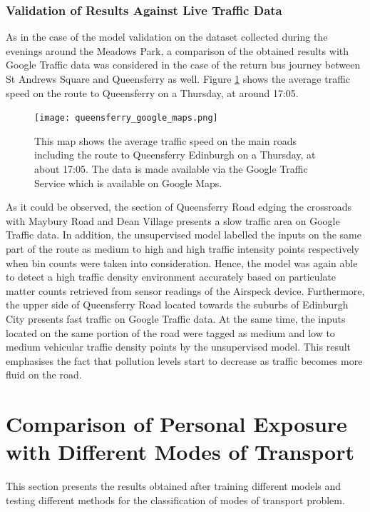 \documentclass[bsc,frontabs,twoside,singlespacing, parskip,deptreport]{infthesis}     %
\begin{document}
\subsubsection*{Validation of Results Against Live Traffic Data}

As in the case of the model validation on the dataset collected during the evenings around the Meadows Park, a comparison of the obtained results with Google Traffic data was considered in the case of the return bus journey between St Andrews Square and Queensferry as well. Figure \ref{fig:queensferry-google-maps} shows the average traffic speed on the route to Queensferry on a Thursday, at around 17:05.

\begin{figure}[h!]
  \center
  \texttt{[image: queensferry\_google\_maps.png]}
  \caption{This map shows the average traffic speed on the main roads including the route to Queensferry Edinburgh on a Thursday, at about 17:05. The data is made available via the Google Traffic Service which is available on Google Maps.}
  \label{fig:queensferry-google-maps}
\end{figure}

As it could be observed, the section of Queensferry Road edging the crossroads with Maybury Road and Dean Village presents a slow traffic area on Google Traffic data. In addition, the unsupervised model labelled the inputs on the same part of the route as medium to high and high traffic intensity points respectively when bin counts were taken into consideration. Hence, the model was again able to detect a high traffic density environment accurately based on particulate matter counts retrieved from sensor readings of the Airspeck device. Furthermore, the upper side of Queensferry Road located towards the suburbs of Edinburgh City presents fast traffic on Google Traffic data. At the same time, the inputs located on the same portion of the road were tagged as medium and low to medium vehicular traffic density points by the unsupervised model. This result emphasises the fact that pollution levels start to decrease as traffic becomes more fluid on the road.


\section{Comparison of Personal Exposure with Different Modes of Transport}

This section presents the results obtained after training different models and testing different methods for the classification of modes of transport problem.
\end{document}
